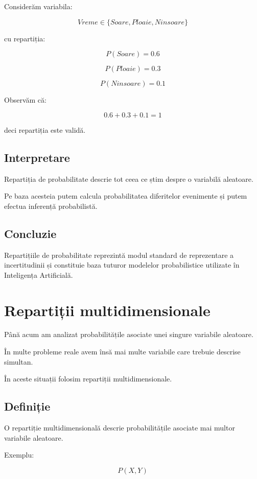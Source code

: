 \documentclass[12pt,a4paper]{article}
\begin{document}
Considerăm variabila:

\[
Vreme \in
\{Soare, Ploaie, Ninsoare\}
\]

cu repartiția:

\[
P(Soare)=0.6
\]

\[
P(Ploaie)=0.3
\]

\[
P(Ninsoare)=0.1
\]

Observăm că:

\[
0.6+0.3+0.1=1
\]

deci repartiția este validă.

\subsection{Interpretare}

Repartiția de probabilitate descrie tot ceea ce știm despre o variabilă aleatoare.

Pe baza acesteia putem calcula probabilitatea diferitelor evenimente și putem efectua inferență probabilistă.

\subsection{Concluzie}

Repartițiile de probabilitate reprezintă modul standard de reprezentare a incertitudinii și constituie baza tuturor modelelor probabilistice utilizate în Inteligența Artificială.




\section{Repartiții multidimensionale}

Până acum am analizat probabilitățile asociate unei singure variabile aleatoare.

În multe probleme reale avem însă mai multe variabile care trebuie descrise simultan.

În aceste situații folosim repartiții multidimensionale.

\subsection{Definiție}

O repartiție multidimensională descrie probabilitățile asociate mai multor variabile aleatoare.

Exemplu:

\[
P(X,Y)
\]
\end{document}
